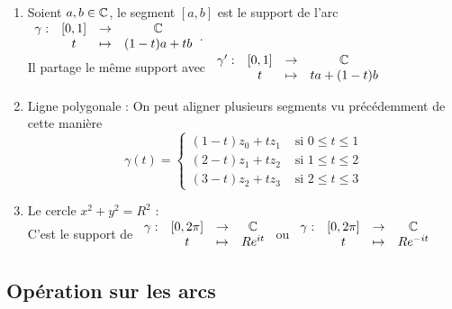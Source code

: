 \documentclass[]{report}
\begin{document}
\begin{enumerate}
    \item Soient $a,b\in\mathbb{C}$, le segment $[a,b]$ est le support de l'arc $\begin{array}{ccccc}
\gamma : & [0,1] & \to & \mathbb{C} \\
  & t & \mapsto & (1-t)a+tb
\end{array}$.\\
Il partage le même support avec $\begin{array}{ccccc}
\gamma' : & [0,1] & \to & \mathbb{C} \\
  & t & \mapsto & ta+(1-t)b
\end{array}$
    \item Ligne polygonale : On peut aligner plusieurs segments vu précédemment de cette manière $$\gamma(t)=\left\{\begin{array}{ll}
 (1-t)z_0+tz_1 & \text{ si } 0 \le t \le 1\\
 (2-t)z_1+tz_2 & \text{ si } 1 \le t \le 2\\
 (3-t)z_2+tz_3 & \text{ si } 2 \le t \le 3
 \end{array}\right.$$
    \item Le cercle $x^2+y^2=R^2$ :\\
    C'est le support de $\begin{array}{ccccc}
\gamma : & [0,2\pi] & \to & \mathbb{C} \\
  & t & \mapsto & Re^{it}
\end{array}$ ou $\begin{array}{ccccc}
\gamma : & [0,2\pi] & \to & \mathbb{C} \\
  & t & \mapsto & Re^{-it}
\end{array}$
\end{enumerate}

\subsection{Opération sur les arcs}
\end{document}
